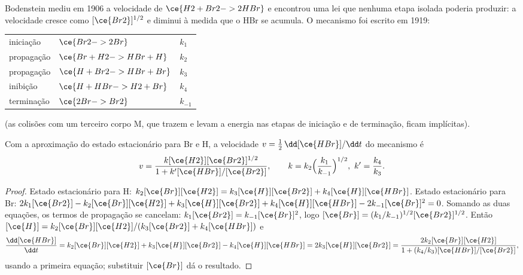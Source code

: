 Bodenstein mediu em 1906 a velocidade de $\ce{H2 + Br2 -> 2 HBr}$ e encontrou uma lei
que nenhuma etapa isolada poderia produzir: a velocidade cresce como $[\ce{Br2}]^{1/2}$
e diminui à medida que o HBr se acumula. O mecanismo foi escrito em 1919:
\begin{center}
\begin{tabular}{lll}
iniciação & $\ce{Br2 -> 2 Br}$ & $k_1$ \\
propagação & $\ce{Br + H2 -> HBr + H}$ & $k_2$ \\
propagação & $\ce{H + Br2 -> HBr + Br}$ & $k_3$ \\
inibição & $\ce{H + HBr -> H2 + Br}$ & $k_4$ \\
terminação & $\ce{2 Br -> Br2}$ & $k_{-1}$
\end{tabular}
\end{center}
(as colisões com um terceiro corpo M, que trazem e levam a energia nas etapas de
iniciação e de terminação, ficam implícitas).

\begin{theorem}\label{thm:b3:complex-kinetics:hbr}
Com a aproximação do estado estacionário para Br e H, a velocidade $v = \frac12\,\dd[\ce{HBr}]/\dd t$
do mecanismo é
\[
  v = \frac{k[\ce{H2}][\ce{Br2}]^{1/2}}{1 + k'[\ce{HBr}]/[\ce{Br2}]},
  \qquad k = k_2\Bigl(\frac{k_1}{k_{-1}}\Bigr)^{1/2},\ k' = \frac{k_4}{k_3}.
\]
\end{theorem}

\begin{proof}
Estado estacionário para H: $k_2[\ce{Br}][\ce{H2}] = k_3[\ce{H}][\ce{Br2}] + k_4[\ce{H}][\ce{HBr}]$. Estado estacionário para Br:
$2k_1[\ce{Br2}] - k_2[\ce{Br}][\ce{H2}] + k_3[\ce{H}][\ce{Br2}] + k_4[\ce{H}][\ce{HBr}] - 2k_{-1}[\ce{Br}]^2 = 0$. Somando as duas
equações, os termos de propagação se cancelam: $k_1[\ce{Br2}] = k_{-1}[\ce{Br}]^2$, logo $[\ce{Br}] =
(k_1/k_{-1})^{1/2}[\ce{Br2}]^{1/2}$. Então $[\ce{H}] = k_2[\ce{Br}][\ce{H2}]/(k_3[\ce{Br2}] + k_4[\ce{HBr}])$ e
\[
  \frac{\dd[\ce{HBr}]}{\dd t} = k_2[\ce{Br}][\ce{H2}] + k_3[\ce{H}][\ce{Br2}] - k_4[\ce{H}][\ce{HBr}] = 2k_3[\ce{H}][\ce{Br2}]
  = \frac{2k_2[\ce{Br}][\ce{H2}]}{1 + (k_4/k_3)[\ce{HBr}]/[\ce{Br2}]},
\]
usando a primeira equação; substituir $[\ce{Br}]$ dá o resultado.
\end{proof}


